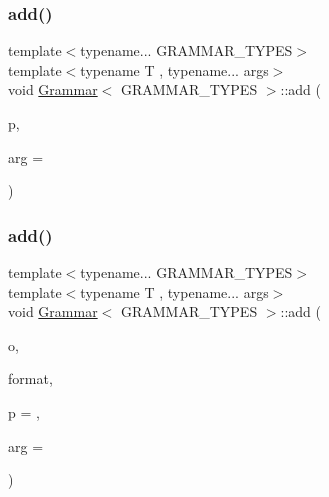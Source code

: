 \subsubsection{\texorpdfstring{add()}{add()}\hspace{0.1cm}{\footnotesize\ttfamily [4/5]}}
{\footnotesize\ttfamily template$<$typename... G\+R\+A\+M\+M\+A\+R\+\_\+\+T\+Y\+P\+ES$>$ \\
template$<$typename T , typename... args$>$ \\
void \hyperlink{class_grammar}{Grammar}$<$ G\+R\+A\+M\+M\+A\+R\+\_\+\+T\+Y\+P\+ES $>$\+::add (\begin{DoxyParamCaption}\item[{\hyperlink{struct_builtin_primitive}{Builtin\+Primitive}$<$ T, args... $>$}]{p,  }\item[{const int}]{arg = {} }\end{DoxyParamCaption})\hspace{0.3cm}{\ttfamily [inline]}}

\mbox{\label{class_grammar_ada3a7374f7aa01a1db5b938e8b9dfa2d}} 
\subsubsection{\texorpdfstring{add()}{add()}\hspace{0.1cm}{\footnotesize\ttfamily [5/5]}}
{\footnotesize\ttfamily template$<$typename... G\+R\+A\+M\+M\+A\+R\+\_\+\+T\+Y\+P\+ES$>$ \\
template$<$typename T , typename... args$>$ \\
void \hyperlink{class_grammar}{Grammar}$<$ G\+R\+A\+M\+M\+A\+R\+\_\+\+T\+Y\+P\+ES $>$\+::add (\begin{DoxyParamCaption}\item[{\hyperlink{_instruction_8h_af2fb7c87c5854c5733d7bb0506b06de7}{Builtin\+Op}}]{o,  }\item[{std\+::string}]{format,  }\item[{const double}]{p = {},  }\item[{const int}]{arg = {} }\end{DoxyParamCaption})\hspace{0.3cm}{\ttfamily [inline]}}

\mbox{\label{class_grammar_a51a44e86d41c6e8a8ff7665208ac55da}} 
